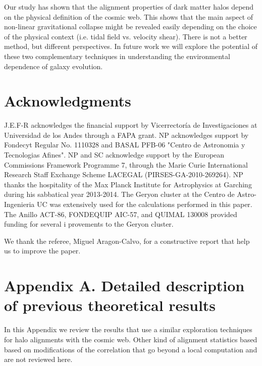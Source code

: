 \documentclass[useAMS,usenatbib]{mn2e}
\begin{document}
Our study has shown that the alignment properties of dark matter
halos depend on the physical definition of the cosmic web. This shows
that the main aspect of non-linear gravitational collapse might be
revealed easily depending on the choice of the physical context
(i.e. tidal field vs. velocity shear). There is not a better method,
but different perspectives. In future work we will explore the
potential of these two complementary techniques in understanding the
environmental dependence of galaxy evolution.

\section*{Acknowledgments}

J.E.F-R acknowledges the financial support by Vicerrector\'ia de
Investigaciones at Universidad de los Andes through a FAPA grant.
NP acknowledges support by Fondecyt Regular No. 1110328 and BASAL PFB-06 "Centro de Astronomia y Tecnologias Afines".
NP and SC acknowledge support by the European Commissions Framework
Programme 7, through the Marie Curie International Research Staff
Exchange Scheme LACEGAL (PIRSES-GA-2010-269264). NP thanks the
hospitality of the Max Planck Institute for Astrophysics at Garching
during his sabbatical year 2013-2014. The Geryon cluster at the Centro de Astro-Ingenieria UC was extensively used for the calculations performed in this paper.
The Anillo ACT-86, FONDEQUIP AIC-57, and QUIMAL 130008 provided
funding for several i provements to the Geryon cluster.

We thank the referee, Miguel Aragon-Calvo, for a constructive report
that help us to improve the paper.  



\section*{Appendix A. Detailed description of previous theoretical results}

In this Appendix we review the results that use a similar exploration
techniques for halo alignments with the cosmic web. Other kind of
alignment statistics based based on modifications of the correlation
\citep[e.g.][]{Paz2008,Faltenbacher2009} that go beyond a local computation
and are not reviewed here.
\end{document}
